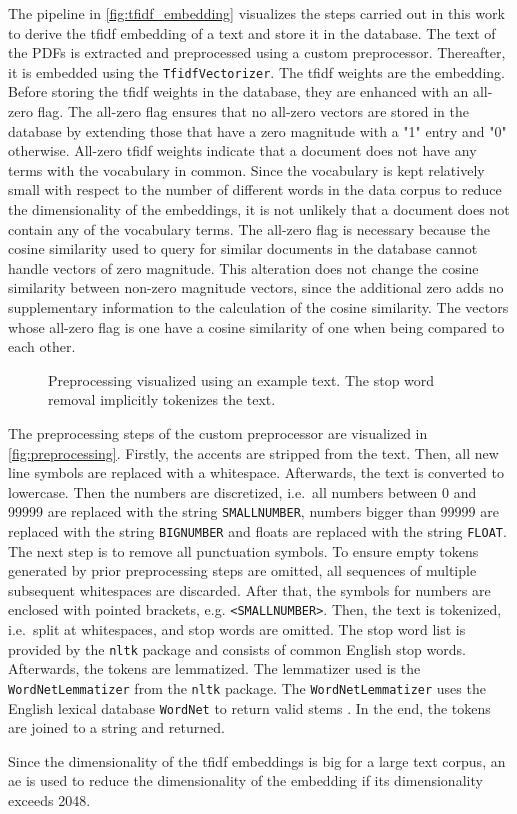 The pipeline in \autoref{fig:tfidf_embedding} visualizes the steps carried out in this work 
to derive the \ac{tfidf} embedding of a text and store it in the database.
The text of the PDFs is extracted and preprocessed using a custom preprocessor.
Thereafter, it is embedded using the \texttt{TfidfVectorizer}.
The \ac{tfidf} weights are the embedding.
Before storing the \ac{tfidf} weights in the database, they are enhanced with an all-zero flag.
The all-zero flag ensures that no all-zero vectors are stored in the database by extending those that have a zero magnitude with a "1" entry and "0" otherwise.
All-zero \ac{tfidf} weights indicate that a document does not have any terms with the vocabulary in common.
Since the vocabulary is kept relatively small with respect to the number of different words in the data corpus to reduce the dimensionality of the embeddings, 
it is not unlikely that a document does not contain any of the vocabulary terms.
The all-zero flag is necessary because the cosine similarity used to query for similar documents in the database cannot handle vectors of zero magnitude.
This alteration does not change the cosine similarity between non-zero magnitude vectors, 
since the additional zero adds no supplementary information to the calculation of the cosine similarity.
The vectors whose all-zero flag is one have a cosine similarity of one when being compared to each other.


\begin{figure}[!htp] %
    \centering
    
    \caption[Preprocessing]{Preprocessing visualized using an example text.
    The stop word removal implicitly tokenizes the text.}
    \label{fig:preprocessing}
\end{figure}

The preprocessing steps of the custom preprocessor are visualized in \autoref{fig:preprocessing}.
Firstly, the accents are stripped from the text.
Then, all new line symbols are replaced with a whitespace.
Afterwards, the text is converted to lowercase.
Then the numbers are discretized, i.e.\ all numbers between 0 and 99999 are replaced with the string \texttt{SMALLNUMBER}, 
numbers bigger than 99999 are replaced with the string \texttt{BIGNUMBER} and floats are replaced with the string \texttt{FLOAT}.
The next step is to remove all punctuation symbols.
To ensure empty tokens generated by prior preprocessing steps are omitted, 
all sequences of multiple subsequent whitespaces are discarded.
After that, the symbols for numbers are enclosed with pointed brackets, e.g. \texttt{<SMALLNUMBER>}.
Then, the text is tokenized, i.e.\ split at whitespaces, and stop words are omitted.
The stop word list is provided by the \texttt{nltk} package 
and consists of common English stop words.
Afterwards, the tokens are lemmatized.
The lemmatizer used is the \texttt{WordNetLemmatizer} from the \texttt{nltk} package.
The \texttt{WordNetLemmatizer} uses the English lexical database \texttt{WordNet} to return valid stems \cite{nltk-lemma-wordnet}.
In the end, the tokens are joined to a string and returned.

Since the dimensionality of the \ac{tfidf} embeddings is big for a large text corpus, 
an \ac{ae} is used to reduce the dimensionality of the embedding if its dimensionality exceeds 2048.